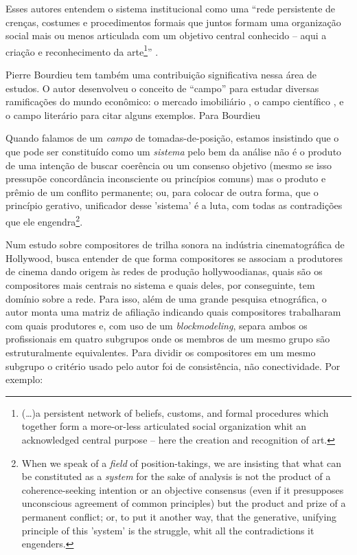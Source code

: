 \documentclass[a4paper, 12pt, openright, oneside, german, french, english, brazil]{abntex2}
\begin{document}
	Esses autores entendem o sistema institucional como uma ``rede persistente de crenças, costumes e procedimentos formais que juntos formam uma organização social mais ou menos articulada com um objetivo central conhecido – aqui a criação e reconhecimento da arte\footnote{(…)a persistent network of beliefs, customs, and formal procedures which together form a more-or-less articulated social organization whit an acknowledged central purpose – here the creation and recognition of art.}'' \cite[p. 2]{white1993canvases}.
	
	Pierre Bourdieu tem também uma contribuição significativa nessa área de estudos. O autor desenvolveu o conceito de ``campo'' para estudar diversas ramificações do mundo econômico: o mercado imobiliário \cite{bourdieu2005social}, o campo científico \cite{bourdieu2008ciencia}, e o campo literário \cite{bourdieu2005regras} para citar alguns exemplos. Para Bourdieu
	
	\begin{citacao}
		Quando falamos de um \textit{campo} de tomadas-de-posição, estamos insistindo que o que pode ser constituído como um \textit{sistema} pelo bem da análise não é o produto de uma intenção de buscar coerência ou um consenso objetivo (mesmo se isso pressupõe concordância inconsciente ou princípios comuns) mas o produto e prêmio de um conflito permanente; ou, para colocar de outra forma, que o princípio gerativo, unificador desse 'sistema' é a luta, com todas as contradições que ele engendra\footnote{When we speak of a \textit{field} of position-takings, we are insisting that what can be constituted as a \textit{system} for the sake of analysis is not the product of a coherence-seeking intention or an objective consensus (even if it presupposes unconscious agreement of common principles) but the product and prize of a permanent conflict; or, to put it another way, that the generative, unifying principle of this 'system' is the struggle, whit all the contradictions it engenders.}. \cite[p. 34]{bourdieu1993field}
	\end{citacao}
	
	Num estudo sobre compositores de trilha sonora na indústria cinematográfica de Hollywood,  busca entender de que forma compositores se associam a produtores de cinema dando origem às redes de produção hollywoodianas, quais são os compositores mais centrais no sistema e quais deles, por conseguinte, tem domínio sobre a rede. Para isso, além de uma grande pesquisa etnográfica, o autor monta uma matriz de afiliação indicando quais compositores trabalharam com quais produtores e, com uso de um \textit{blockmodeling}, separa ambos os profissionais em quatro subgrupos onde os membros de um mesmo grupo são estruturalmente equivalentes. Para dividir os compositores em um mesmo subgrupo o critério usado pelo autor foi de consistência, não conectividade. Por exemplo:
	
\end{document}
